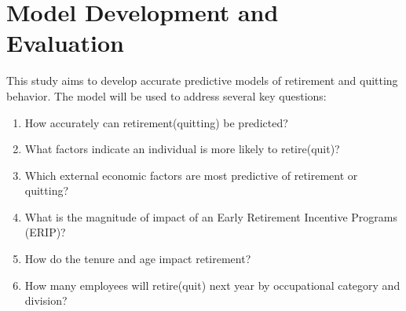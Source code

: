 \documentclass[12pt,letterpaper]{article}
\begin{document}
\section{Model Development and Evaluation}
This study aims to develop accurate predictive models of retirement and quitting behavior. The model will be used to address several key questions:
\begin{enumerate}
\item How accurately can retirement(quitting) be predicted?
\item What factors indicate an individual is more likely to retire(quit)?
\item Which external economic factors are most predictive of retirement or quitting?
\item What is the magnitude  of impact of an Early Retirement Incentive Programs (ERIP)?
\item How do the tenure and age impact retirement?
\item How many employees will retire(quit) next year by occupational category and division?
\end{enumerate}

\end{document}
